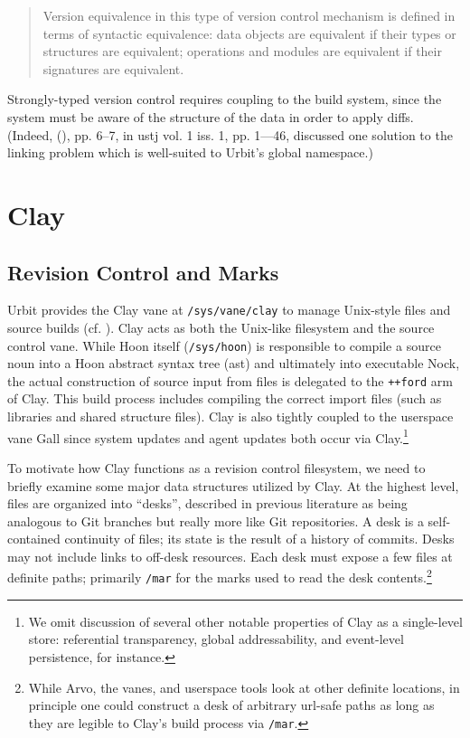 \documentclass[twoside]{article}
\begin{document}
\begin{quote}
  Version equivalence in this type of version control mechanism is defined in terms of syntactic equivalence:  data objects are equivalent if their types or structures are equivalent; operations and modules are equivalent if their signatures are equivalent.  \citep{Perry1987}
\end{quote}

\noindent
Strongly-typed version control requires coupling to the build system, since the system must be aware of the structure of the data in order to apply diffs.  (Indeed, \citeauthor{Blackman2024} (\citeyear{Blackman2024}), pp. 6–7, in {\sc ustj} vol. 1 iss. 1, pp. 1—46, discussed one solution to the linking problem which is well-suited to Urbit's global namespace.)


\section{Clay}

\subsection{Revision Control and Marks}

Urbit provides the Clay vane at \lstinline[style=inlinecode]{/sys/vane/clay} to manage Unix-style files and source builds (cf. \citet{Yarvin2016}).  Clay acts as both the Unix-like filesystem and the source control vane.  While Hoon itself (\lstinline[style=inlinecode]{/sys/hoon}) is responsible to compile a source noun into a Hoon abstract syntax tree ({\sc ast}) and ultimately into executable Nock, the actual construction of source input from files is delegated to the \lstinline[style=inlinecode]{++ford} arm of Clay.  This build process includes compiling the correct import files (such as libraries and shared structure files).  Clay is also tightly coupled to the userspace vane Gall since system updates and agent updates both occur via Clay.\footnote{We omit discussion of several other notable properties of Clay as a single-level store:  referential transparency, global addressability, and event-level persistence, for instance.}

To motivate how Clay functions as a revision control filesystem, we need to briefly examine some major data structures utilized by Clay.  At the highest level, files are organized into “desks”, described in previous literature as being analogous to Git branches but really more like Git repositories.  A desk is a self-contained continuity of files; its state is the result of a history of commits.  Desks may not include links to off-desk resources.  Each desk must expose a few files at definite paths; primarily \lstinline[style=inlinecode]{/mar} for the marks used to read the desk contents.\footnote{While Arvo, the vanes, and userspace tools look at other definite locations, in principle one could construct a desk of arbitrary {\sc url}-safe paths as long as they are legible to Clay's build process via \lstinline[style=inlinecode]{/mar}.}
\end{document}
